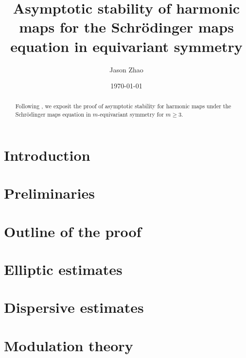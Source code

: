 \documentclass[reqno]{amsart}
\title
{
	Asymptotic stability of harmonic maps for the Schr\"odinger maps equation in equivariant symmetry
}
\author{Jason Zhao}
\date{\today}
\begin{document}
\begin{abstract}
	Following \cite{GustafsonEtAl2010}, we exposit the proof of asymptotic stability for harmonic maps under the Schr\"odinger maps equation in $m$-equivariant symmetry for $m \geq 3$. 
\end{abstract}
\maketitle

\setcounter{tocdepth}{1}
\tableofcontents

\section{Introduction}


\section{Preliminaries}



\section{Outline of the proof}


\section{Elliptic estimates}


\section{Dispersive estimates}


\section{Modulation theory}


\appendix

\section{}




\end{document}
